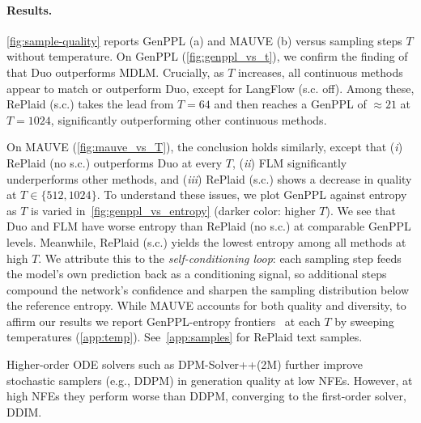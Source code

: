 \documentclass{article}
\begin{document}
%

%

%
%
%
%
%
%



\paragraph{Results.} \cref{fig:sample-quality} reports GenPPL (a) and MAUVE (b) versus sampling steps $T$ without temperature. On GenPPL (\cref{fig:genppl_vs_t}), we confirm the finding of~\citep{sahoo2025the} that Duo outperforms MDLM. Crucially, as $T$ increases, all continuous methods appear to match or outperform Duo, except for LangFlow (s.c. off). Among these, RePlaid (s.c.) takes the lead from $T=64$ and then reaches a GenPPL of $\approx21$ at $T = 1024$, significantly outperforming other continuous methods. 

On MAUVE (\cref{fig:mauve_vs_T}), the conclusion holds similarly, except that (\textit{i}) RePlaid (no s.c.) outperforms Duo at every $T$, (\textit{ii}) FLM significantly underperforms other methods, and (\textit{iii}) RePlaid (s.c.) shows a decrease in quality at $T\in\{512, 1024\}$. To understand these issues, we plot GenPPL against entropy as $T$ is varied in~\cref{fig:genppl_vs_entropy} (darker color: higher $T$). We see that Duo and FLM have worse entropy than RePlaid (no s.c.) at comparable GenPPL levels. Meanwhile, RePlaid (s.c.) yields the lowest entropy among all methods at high $T$. We attribute this to the \textit{self-conditioning loop}: each sampling step feeds the model's own prediction back as a conditioning signal, so additional steps compound the network's confidence and sharpen the sampling distribution below the reference entropy. While MAUVE accounts for both quality and diversity, to affirm our results we report GenPPL-entropy frontiers~\citep{pynadath2025candi} at each $T$ by sweeping temperatures (\cref{app:temp}). See~\cref{app:samples} for RePlaid text samples.

%

%

%

%

\begin{findingbox}
   Higher-order ODE solvers such as DPM-Solver++(2M) further improve stochastic samplers (e.g., DDPM) in generation quality at low NFEs. However, at high NFEs they perform worse than DDPM, converging to the first-order solver, DDIM.
\end{findingbox}
\end{document}
